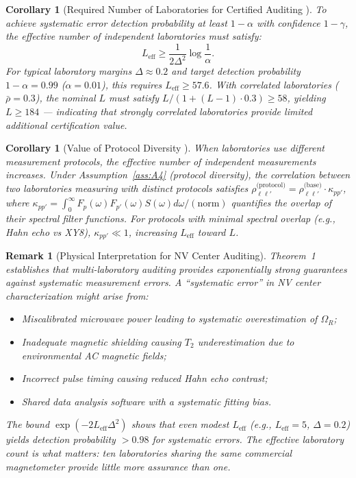 \documentclass[11pt,a4paper]{article}
\newcommand{\eff}{\mathrm{eff}}
\newtheorem{corollary}[theorem]{Corollary}
\newtheorem{remark}[theorem]{Remark}
\theoremstyle{definition}
\newcommand{\Ttwo}{T_2}
\newcommand{\NV}{NV}
\newcommand{\RabiFreq}{\Omega_R}
\begin{document}
\begin{corollary}[Required Number of Laboratories for Certified Auditing ]
\label{cor:required_L}
To achieve systematic error detection probability at least $1 - \alpha$
with confidence $1 - \gamma$, the effective number of independent laboratories
must satisfy:
\begin{equation}
    L_{\eff} \geq \frac{1}{2\Delta^2} \log\frac{1}{\alpha}.
\end{equation}
For typical laboratory margins $\Delta \approx 0.2$ and target detection
probability $1-\alpha = 0.99$ ($\alpha = 0.01$), this requires
$L_{\eff} \geq 57.6$. With correlated laboratories ($\bar{\rho} = 0.3$),
the nominal $L$ must satisfy $L/(1 + (L-1) \cdot 0.3) \geq 58$,
yielding $L \geq 184$ — indicating that strongly correlated laboratories
provide limited additional certification value.
\end{corollary}

\begin{corollary}[Value of Protocol Diversity ]
\label{cor:protocol_diversity}
When laboratories use different measurement protocols, the effective
number of independent measurements increases. Under Assumption~\ref{ass:A4}
(protocol diversity), the correlation between two laboratories measuring
with distinct protocols satisfies $\rho_{\ell\ell'}^{\text{(protocol)}} = \rho_{\ell\ell'}^{\text{(base)}} \cdot \kappa_{pp'}$,
where $\kappa_{pp'} = \int_0^\infty F_p(\omega) F_{p'}(\omega) S(\omega) d\omega / (\text{norm})$
quantifies the overlap of their spectral filter functions. For protocols
with minimal spectral overlap (e.g., Hahn echo vs XY8), $\kappa_{pp'} \ll 1$,
increasing $L_{\eff}$ toward $L$.
\end{corollary}

\begin{remark}[Physical Interpretation for NV Center Auditing]
\label{rem:nv_interpretation}
Theorem~1 establishes that multi-laboratory auditing provides exponentially
strong guarantees against systematic measurement errors. A ``systematic error''
in \NV{} center characterization might arise from:
\begin{itemize}[nosep]
    \item Miscalibrated microwave power leading to systematic overestimation
    of $\RabiFreq$;
    \item Inadequate magnetic shielding causing $\Ttwo$ underestimation
    due to environmental AC magnetic fields;
    \item Incorrect pulse timing causing reduced Hahn echo contrast;
    \item Shared data analysis software with a systematic fitting bias.
\end{itemize}
The bound $\exp(-2 L_{\eff} \Delta^2)$ shows that even modest $L_{\eff}$
(e.g., $L_{\eff}=5$, $\Delta=0.2$) yields detection probability $>0.98$
for systematic errors. The {\em effective} laboratory count is what matters:
ten laboratories sharing the same commercial magnetometer provide little
more assurance than one.
\end{remark}
\end{document}
